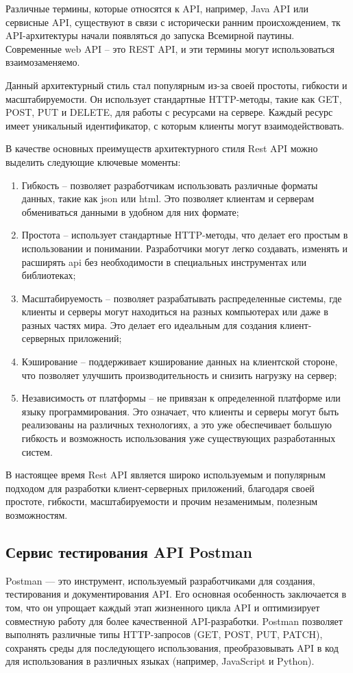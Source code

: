 \documentclass[master, och, diploma]{SCWorks}
\begin{document}
Различные термины, которые относятся к API, например, Java API или сервисные API, существуют в связи с исторически ранним происхождением, тк API-архитектуры начали появляться до запуска Всемирной паутины. Современные web API – это REST API, и эти термины могут использоваться взаимозаменяемо.

Данный архитектурный стиль стал популярным из-за своей простоты, гибкости и масштабируемости. Он использует стандартные HTTP-методы, такие как GET, POST, PUT и DELETE, для работы с ресурсами на сервере. Каждый ресурс имеет уникальный идентификатор, с которым клиенты могут взаимодействовать.

В качестве основных преимуществ архитектурного стиля Rest API можно выделить следующие ключевые моменты:
\begin{enumerate}
    \item Гибкость – позволяет разработчикам использовать различные форматы данных, такие как json или html. Это позволяет клиентам и серверам обмениваться данными в удобном для них формате;
    \item Простота – использует стандартные HTTP-методы, что делает его простым в использовании и понимании. Разработчики могут легко создавать, изменять и расширять api без необходимости в специальных инструментах или библиотеках;
    \item Масштабируемость – позволяет разрабатывать распределенные системы, где клиенты и серверы могут находиться на разных компьютерах или даже в разных частях мира. Это делает его идеальным для создания клиент-серверных приложений;
    \item Кэширование – поддерживает кэширование данных на клиентской стороне, что позволяет улучшить производительность и снизить нагрузку на сервер;
    \item Независимость от платформы – не привязан к определенной платформе или языку программирования. Это означает, что клиенты и серверы могут быть реализованы на различных технологиях, а это уже обеспечивает большую гибкость и возможность использования уже существующих разработанных систем.\cite{Masse_rest}
\end{enumerate}

В настоящее время Rest API является широко используемым и популярным подходом для разработки клиент-серверных приложений, благодаря своей простоте, гибкости, масштабируемости и прочим незаменимым, полезным возможностям.



\subsection{Сервис тестирования API Postman}
Postman — это инструмент, используемый разработчиками для создания, тестирования и документирования API. Его основная особенность заключается в том, что он упрощает каждый этап жизненного цикла API и оптимизирует совместную работу для более качественной API-разработки\cite{postman_what}. Postman позволяет выполнять различные типы HTTP-запросов (GET, POST, PUT, PATCH), сохранять среды для последующего использования, преобразовывать API в код для использования в различных языках (например, JavaScript и Python).
\end{document}
